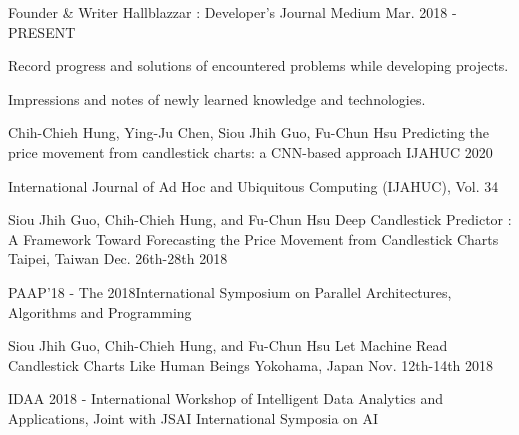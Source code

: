 

\begin{cventries}

    \cventry
        {Founder \& Writer} %
        {Hallblazzar : Developer's Journal} %
        {Medium} %
        {Mar. 2018 - PRESENT} %
        {
          \begin{cvitems} %
            \item {Record progress and solutions of encountered problems while developing projects.} 
            \item {Impressions and notes of newly learned knowledge and technologies.}
          \end{cvitems}
        }

    \cventry
        {Chih-Chieh Hung, Ying-Ju Chen, Siou Jhih Guo, Fu-Chun Hsu}
        {Predicting the price movement from candlestick charts: a CNN-based approach}
        {IJAHUC}
        {2020}
        {
            \begin{cvitems}
                \item {International Journal of Ad Hoc and Ubiquitous Computing (IJAHUC), Vol. 34}
            \end{cvitems}
        }

    \cventry
        {Siou Jhih Guo, Chih-Chieh Hung, and Fu-Chun Hsu}
        {Deep Candlestick Predictor : A Framework Toward Forecasting the Price Movement from Candlestick Charts}
        {Taipei, Taiwan}
        {Dec. 26th-28th 2018}
        {
            \begin{cvitems}
                \item {PAAP’18 - The 2018International Symposium on Parallel Architectures, Algorithms and Programming}
            \end{cvitems}
        }

    \cventry
        {Siou Jhih Guo, Chih-Chieh Hung, and Fu-Chun Hsu}
        {Let Machine Read Candlestick Charts Like Human Beings}
        {Yokohama, Japan}
        {Nov. 12th-14th 2018}
        {
            \begin{cvitems}
                \item {IDAA 2018 - International Workshop of Intelligent Data Analytics and Applications, Joint with JSAI International Symposia on AI}
            \end{cvitems}
        }
        
\end{cventries}
